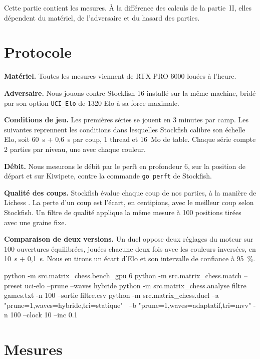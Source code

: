 \documentclass[11pt,a4paper]{article}
\newcommand{\code}[1]{\texttt{#1}}
\newcounter{calcul}
\theoremstyle{plain}
\begin{document}
Cette partie contient les mesures. À la différence des calculs de la partie~II, elles dépendent
du matériel, de l'adversaire et du hasard des parties.

\section{Protocole}

\textbf{Matériel.} Toutes les mesures viennent de RTX PRO 6000 louées à l'heure.

\textbf{Adversaire.} Nous jouons contre Stockfish 16 installé sur la même machine, bridé par
son option \code{UCI\_Elo} de 1320 Elo à sa force maximale.

\textbf{Conditions de jeu.} Les premières séries se jouent en 3 minutes par camp. Les suivantes
reprennent les conditions dans lesquelles Stockfish calibre son échelle Elo, soit 60~s + 0,6~s
par coup, 1 thread et 16~Mo de table. Chaque série compte 2 parties par niveau, une avec chaque
couleur.

\textbf{Débit.} Nous mesurons le débit par le perft en profondeur 6, sur la position de départ
et sur Kiwipete, contre la commande \code{go perft} de Stockfish.

\textbf{Qualité des coups.} Stockfish évalue chaque coup de nos parties, à la manière de Lichess
\cite{lichess}. La perte d'un coup est l'écart, en centipions, avec le meilleur coup selon
Stockfish. Un filtre de qualité applique la même mesure à 100 positions tirées avec une graine
fixe.

\textbf{Comparaison de deux versions.} Un duel oppose deux réglages du moteur sur 100 ouvertures
équilibrées, jouées chacune deux fois avec les couleurs inversées, en 10~s + 0,1~s. Nous en
tirons un écart d'Elo et son intervalle de confiance à 95~\%.

\begin{python}
python -m src.matrix_chess.bench_gpu 6
python -m src.matrix_chess.match --preset uci-elo --prune --waves hybride
python -m src.matrix_chess.analyse filtre games.txt -n 100 --sortie filtre.csv
python -m src.matrix_chess.duel --a "prune=1,waves=hybride,tri=statique" \
    --b "prune=1,waves=adaptatif,tri=mvv" -n 100 --clock 10 --inc 0.1
\end{python}

\section{Mesures}
\end{document}
